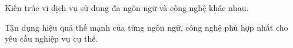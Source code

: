  

Kiến trúc vi dịch vụ sử dụng đa ngôn ngữ và công nghệ khác nhau.

Tận dụng hiệu quả thế mạnh của từng ngôn ngữ, công nghệ phù hợp nhất cho yêu cầu nghiệp vụ cụ thể.


    
    
    
    
    
    
    
